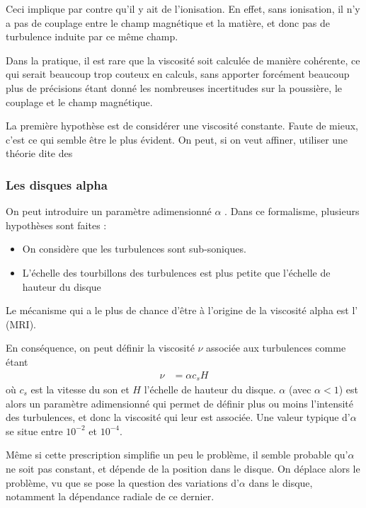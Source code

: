 Ceci implique par contre qu'il y ait de l'ionisation. En effet, sans ionisation, il n'y a pas de couplage entre le champ magnétique et la matière, et donc pas de turbulence induite par ce même champ. 

Dans la pratique, il est rare que la viscosité soit calculée de manière cohérente, ce qui serait beaucoup trop couteux en calculs, sans apporter forcément beaucoup plus de précisions étant donné les nombreuses incertitudes sur la poussière, le couplage et le champ magnétique. 

La première hypothèse est de considérer une viscosité constante. Faute de mieux, c'est ce qui semble être le plus évident. On peut, si on veut affiner, utiliser une théorie dite des 

\subsubsection{Les disques alpha}
On peut introduire un paramètre adimensionné $\alpha$ \citep{shakura1989black}. Dans ce formalisme, plusieurs hypothèses sont faites : 
\begin{itemize}
\item On considère que les turbulences sont sub-soniques.
\item L'échelle des tourbillons des turbulences est plus petite que l'échelle de hauteur du disque
\end{itemize}
Le mécanisme qui a le plus de chance d'être à l'origine de la viscosité alpha est l' (MRI). 

\bigskip

En conséquence, on peut définir la viscosité $\nu$ associée aux turbulences comme étant 
\begin{align}
\nu &= \alpha c_s H
\end{align}
où $c_s$ est la vitesse du son et $H$ l'échelle de hauteur du disque. $\alpha$ (avec $\alpha < 1$) est alors un paramètre adimensionné qui permet de définir plus ou moins l'intensité des turbulences, et donc la viscosité qui leur est associée. Une valeur typique d'$\alpha$ se situe entre $10^{-2}$ et $10^{-4}$.

Même si cette prescription simplifie un peu le problème, il semble probable qu'$\alpha$ ne soit pas constant, et dépende de la position dans le disque. On déplace alors le problème, vu que se pose la question des variations d'$\alpha$ dans le disque, notamment la dépendance radiale de ce dernier.


